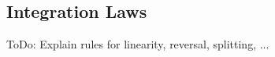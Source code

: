 




\subsection{Integration Laws} 
ToDo: Explain rules for linearity, reversal, splitting, ...








